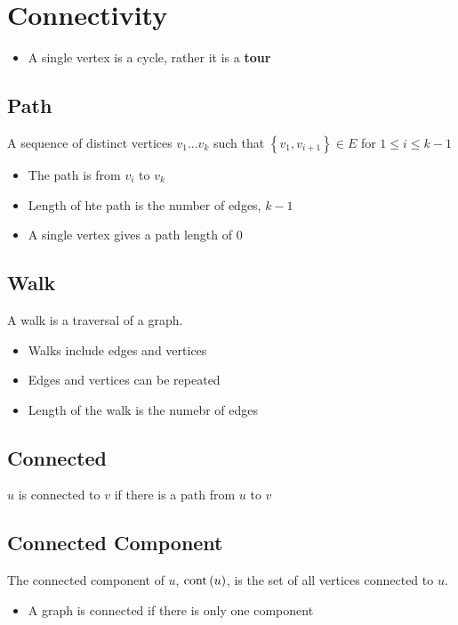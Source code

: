 \section{Connectivity}

  \begin{itemize}
    \item A single vertex is a cycle, rather it is a \textbf{tour}
  \end{itemize}

  \subsection{Path}

    A sequence of distinct vertices $ v_{1} ... v_{k} $ such that
    $ \left\{ v_{1}, v_{i + 1} \right\} \in E $ for $ 1 \le i \le k - 1 $

    \begin{itemize}
      \item The path is from $ v_{i} $ to $ v_{k} $
      \item Length of hte path is the number of edges, $ k - 1 $
      \item A single vertex gives a path length of $ 0 $
    \end{itemize}

  \subsection{Walk}

    A walk is a traversal of a graph.

    \begin{itemize}
      \item Walks include edges and vertices
      \item Edges and vertices can be repeated
      \item Length of the walk is the numebr of edges
    \end{itemize}

  \subsection{Connected}

    $ u $ is connected to $ v $ if there is a path from $ u $ to $ v $

  \subsection{Connected Component}

    The connected component of $ u $, $ \operatorname{cont}\left( u \right) $, is the
    set of all vertices connected to $ u $.

    \begin{itemize}
      \item A graph is connected if there is only one component
    \end{itemize}
